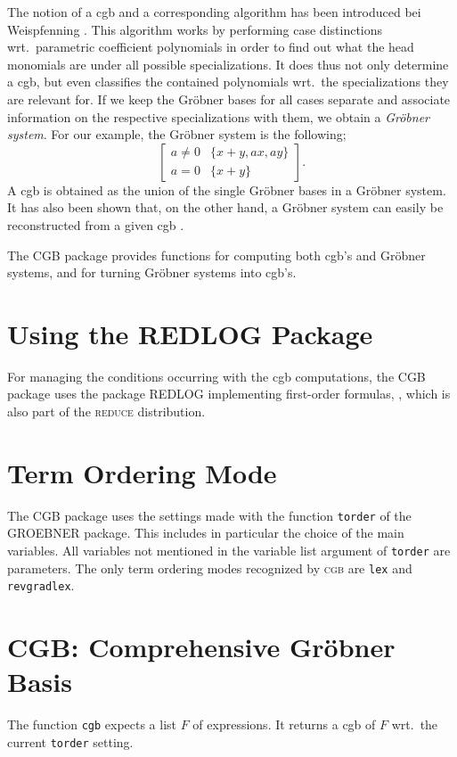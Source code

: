 The notion of a {\sc cgb} and a corresponding algorithm has been
introduced bei Weispfenning \cite{Weispfenning:92}. This algorithm
works by performing case distinctions wrt.~parametric coefficient
polynomials in order to find out what the head monomials are under all
possible specializations. It does thus not only determine a {\sc cgb},
but even classifies the contained polynomials wrt.~the specializations
they are relevant for. If we keep the Gr\"obner bases for all cases
separate and associate information on the respective specializations
with them, we obtain a {\em Gr\"obner system}. For our example, the
Gr\"obner system is the following;
$$
\left[
\begin{array}{c|c}
a\neq0 & \{x+y,ax,ay\}\\
a=0 & \{x+y\}
\end{array}
\right].
$$
A {\sc cgb} is obtained as the union of the single Gr\"obner bases in
a Gr\"obner system. It has also been shown that, on the other hand, a
Gr\"obner system can easily be reconstructed from a given {\sc cgb}
\cite{Weispfenning:92}.

The CGB package provides functions for computing both {\sc cgb}'s and
Gr\"obner systems, and for turning Gr\"obner systems into {\sc cgb}'s.
%
\section{Using the REDLOG Package}
For managing the conditions occurring with the {\sc cgb} computations,
the CGB package uses the package REDLOG implementing first-order
formulas, \cite{DolzmannSturm:97a,DolzmannSturm:99}, which is also
part of the \textsc{reduce} distribution.
%
\section{Term Ordering Mode}
The CGB package uses the settings made with the function {\tt torder}
of the GROEBNER package. This includes in particular the choice of the
main variables. All variables not mentioned in the variable list
argument of {\tt torder} are parameters. The only term ordering modes
recognized by \textsc{cgb} are {\tt lex} and {\tt revgradlex}.
%
\section{CGB: Comprehensive Gr\"ob\-ner Basis}
The function {\tt cgb} expects a list $F$ of expressions. It returns a
{\sc cgb} of $F$ wrt.~the current {\tt torder} setting.
%
